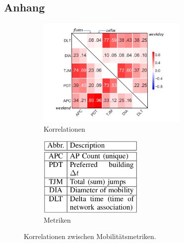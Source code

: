 \documentclass[12pt, a4paper]{article}
\begin{document}
\begin{appendix}
\section*{Anhang}

\begin{figure}[H]
    \centering
    \begin{subfigure}[b]{0.45\textwidth}
        \includegraphics[width=0.8\textwidth]{img/mobility_correlations.png}
        \caption{Korrelationen \cite{Alipour2018}}
    \end{subfigure}
    \hfill
    \begin{subfigure}[b]{0.45\textwidth}
        \includegraphics[width=0.55\textwidth]{img/mobility_metrics.png}
        \caption{Metriken \cite{Alipour2018}}
    \end{subfigure}
    \caption{Korrelationen zwischen Mobilitätsmetriken.}
    \label{fig:mobility_correlations}
\end{figure}


\end{appendix}
\end{document}
